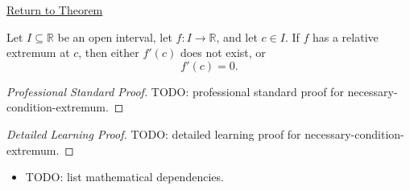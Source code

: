 \newpage
{}
\label{prf:necessary-condition-extremum}

\begin{remark*}[Return]
\hyperref[thm:necessary-condition-extremum]{Return to Theorem}
\end{remark*}

\begin{theorem*}
Let $I \subseteq \mathbb{R}$ be an open interval, let $f : I \to \mathbb{R}$, and let $c \in I$. If $f$ has a relative extremum at $c$, then either $f'(c)$ does not exist, or
\[
f'(c) = 0.
\]
\end{theorem*}

\begin{proof}[Professional Standard Proof]
\LRAProofBodyStart
TODO: professional standard proof for necessary-condition-extremum.
\end{proof}

\begin{proof}[Detailed Learning Proof]
\LRAProofBodyStart
TODO: detailed learning proof for necessary-condition-extremum.
\end{proof}

\begin{remark*}
\end{remark*}

\begin{dependencies}
\begin{itemize}
  \item TODO: list mathematical dependencies.
\end{itemize}
\end{dependencies}

\clearpage
